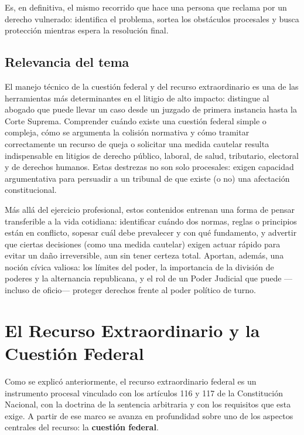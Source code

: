 \documentclass[12pt,oneside]{book}
\begin{document}
Es, en definitiva, el mismo recorrido que hace una persona que reclama por un derecho vulnerado: identifica el problema, sortea los obstáculos procesales y busca protección mientras espera la resolución final.

\section*{Relevancia del tema}

El manejo técnico de la cuestión federal y del recurso extraordinario es una de las herramientas más determinantes en el litigio de alto impacto: distingue al abogado que puede llevar un caso desde un juzgado de primera instancia hasta la Corte Suprema. Comprender cuándo existe una cuestión federal simple o compleja, cómo se argumenta la colisión normativa y cómo tramitar correctamente un recurso de queja o solicitar una medida cautelar resulta indispensable en litigios de derecho público, laboral, de salud, tributario, electoral y de derechos humanos. Estas destrezas no son solo procesales: exigen capacidad argumentativa para persuadir a un tribunal de que existe (o no) una afectación constitucional.

Más allá del ejercicio profesional, estos contenidos entrenan una forma de pensar transferible a la vida cotidiana: identificar cuándo dos normas, reglas o principios están en conflicto, sopesar cuál debe prevalecer y con qué fundamento, y advertir que ciertas decisiones (como una medida cautelar) exigen actuar rápido para evitar un daño irreversible, aun sin tener certeza total. Aportan, además, una noción cívica valiosa: los límites del poder, la importancia de la división de poderes y la alternancia republicana, y el rol de un Poder Judicial que puede —incluso de oficio— proteger derechos frente al poder político de turno.

\chapter[Recurso extraordinario y cuestión federal]{El Recurso Extraordinario y la Cuestión Federal}

Como se explicó anteriormente, el recurso extraordinario federal es un instrumento procesal vinculado con los artículos 116 y 117 de la Constitución Nacional, con la doctrina de la sentencia arbitraria y con los requisitos que esta exige. A partir de ese marco se avanza en profundidad sobre uno de los aspectos centrales del recurso: la \textbf{cuestión federal}.
\end{document}
